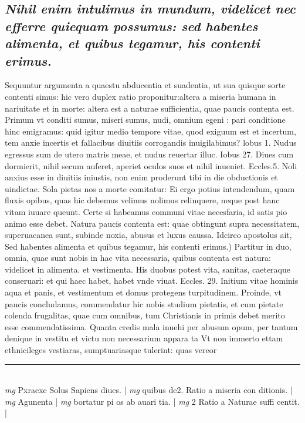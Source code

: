 \documentclass{article}
\begin{document}
\begin{pages}
\subsection*{\textit{Nihil enim intulimus in mundum, videlicet nec efferre quiequam possumus: sed habentes alimenta, et quibus tegamur, his contenti erimus. }}\pstart Sequuntur argumenta a quaestu abducentia et suadentia, ut sua quisque sorte contenti simus: hic vero duplex ratio proponitur:altera a miseria humana in nariuitate et in morte: altera est a naturae sufficientia, quae paucis contenta est. Primum vt conditi sumus, miseri sumus, nudi, omnium egeni : pari conditione hinc emigramus: quid igitur medio tempore vitae, quod exiguum est et incertum, tem anxie incertis et fallacibus diuitiis corrogandis inuigilabimus? lobus 1. Nudus egressus sum de utero matris meae, et nudus reuertar illuc. Iobus 27. Diues cum dormierit, nihil secum auferet, aperiet oculos suos et nihil inueniet. Eccles.5. Noli anxius esse in diuitiis iniustis, non enim proderunt tibi in die obductionis et uindictae. Sola pietas nos a morte comitatur: Ei ergo potius intendendum, quam fluxis opibus, quas hic debemus velimus nolimus relinquere, neque post hanc vitam iuuare queunt. Certe si habeamus communi vitae necesfaria, id satis pio animo esse debet. Natura paucis contenta est: quae obtingunt supra necessitatem, superuacanea sunt, subinde noxia, abusus et luxus caussa. Idcirco apostolus ait,  \pend\pstart Sed habentes alimenta et quibus tegamur, his contenti erimus.) Partitur in duo, omnia, quae sunt nobis in hac vita necessaria, quibus contenta est natura: videlicet in alimenta. et vestimenta. His duobus potest vita, sanitas, caeteraque conseruari: et qui haec habet, habet vnde viuat. Eccles. 29. Initium vitae hominis aqua et panis, et vestimentum et domus protegens turpitudinem. Proinde, vt paucis concludamus, commendatur hic nobis studium pietatis, et cum pietate colenda frugalitas, quae cum omnibus, tum Christianis in primis debet merito esse commendatissima. Quanta credis mala inuehi per abusum opum, per tantum denique in vestitu et victu non necessarium appara ta Vt non immerto ettam ethnicileges vestiaras, sumptuariasque tulerint: quas vereor  \pend
\vspace{0.5cm}\noindent
\vspace{0.2cm}\rule{1cm}{0.2pt}\\ 
\hspace{0.2cm}\textit{mg}
\footnotesize Pxraexe Solus Sapiens diues. 
\normalsize| 
\hspace{0.2cm}\textit{mg}
\footnotesize quibus de2. Ratio a miseria con ditionis. 
\normalsize| 
\hspace{0.2cm}\textit{mg}
\footnotesize Agunenta 
\normalsize| 
\hspace{0.2cm}\textit{mg}
\footnotesize bortatur pi os ab auari tia. 
\normalsize| 
\hspace{0.2cm}\textit{mg}
\footnotesize 2 Ratio a Naturae suffi centit. 
\normalsize| 

\end{pages}
\end{document}
